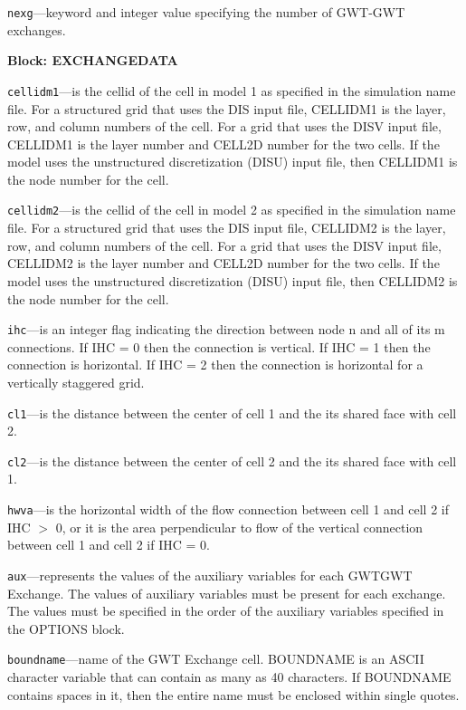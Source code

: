 \begin{description}
\item \texttt{nexg}---keyword and integer value specifying the number of GWT-GWT exchanges.

\end{description}
\item \textbf{Block: EXCHANGEDATA}

\begin{description}
\item \texttt{cellidm1}---is the cellid of the cell in model 1 as specified in the simulation name file. For a structured grid that uses the DIS input file, CELLIDM1 is the layer, row, and column numbers of the cell.   For a grid that uses the DISV input file, CELLIDM1 is the layer number and CELL2D number for the two cells.  If the model uses the unstructured discretization (DISU) input file, then CELLIDM1 is the node number for the cell.

\item \texttt{cellidm2}---is the cellid of the cell in model 2 as specified in the simulation name file. For a structured grid that uses the DIS input file, CELLIDM2 is the layer, row, and column numbers of the cell.   For a grid that uses the DISV input file, CELLIDM2 is the layer number and CELL2D number for the two cells.  If the model uses the unstructured discretization (DISU) input file, then CELLIDM2 is the node number for the cell.

\item \texttt{ihc}---is an integer flag indicating the direction between node n and all of its m connections. If IHC = 0 then the connection is vertical.  If IHC = 1 then the connection is horizontal. If IHC = 2 then the connection is horizontal for a vertically staggered grid.

\item \texttt{cl1}---is the distance between the center of cell 1 and the its shared face with cell 2.

\item \texttt{cl2}---is the distance between the center of cell 2 and the its shared face with cell 1.

\item \texttt{hwva}---is the horizontal width of the flow connection between cell 1 and cell 2 if IHC $>$ 0, or it is the area perpendicular to flow of the vertical connection between cell 1 and cell 2 if IHC = 0.

\item \texttt{aux}---represents the values of the auxiliary variables for each GWTGWT Exchange. The values of auxiliary variables must be present for each exchange. The values must be specified in the order of the auxiliary variables specified in the OPTIONS block.

\item \texttt{boundname}---name of the GWT Exchange cell.  BOUNDNAME is an ASCII character variable that can contain as many as 40 characters.  If BOUNDNAME contains spaces in it, then the entire name must be enclosed within single quotes.

\end{description}

